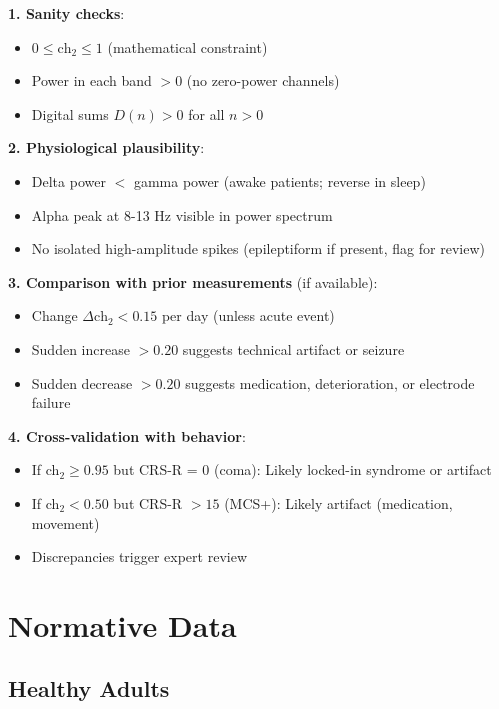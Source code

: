 \begin{protocol}\label{prot:validation}
\textbf{1. Sanity checks}:
\begin{itemize}
\item $0 \leq \text{ch}_2 \leq 1$ (mathematical constraint)
\item Power in each band $> 0$ (no zero-power channels)
\item Digital sums $D(n) > 0$ for all $n > 0$
\end{itemize}

\textbf{2. Physiological plausibility}:
\begin{itemize}
\item Delta power $<$ gamma power (awake patients; reverse in sleep)
\item Alpha peak at 8-13 Hz visible in power spectrum
\item No isolated high-amplitude spikes (epileptiform if present, flag for review)
\end{itemize}

\textbf{3. Comparison with prior measurements} (if available):
\begin{itemize}
\item Change $\Delta \text{ch}_2 < 0.15$ per day (unless acute event)
\item Sudden increase $> 0.20$ suggests technical artifact or seizure
\item Sudden decrease $> 0.20$ suggests medication, deterioration, or electrode failure
\end{itemize}

\textbf{4. Cross-validation with behavior}:
\begin{itemize}
\item If ch$_2 \geq 0.95$ but CRS-R = 0 (coma): Likely locked-in syndrome or artifact
\item If ch$_2 < 0.50$ but CRS-R $> 15$ (MCS+): Likely artifact (medication, movement)
\item Discrepancies trigger expert review
\end{itemize}
\end{protocol}

\section{Normative Data}

\subsection{Healthy Adults}

